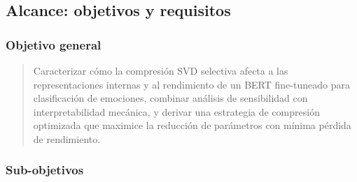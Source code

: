 \subsection{Alcance: objetivos y requisitos}
\label{sec:gep-alcance}

\subsubsection{Objetivo general}

\begin{quote}
    Caracterizar cómo la compresión SVD selectiva afecta a las
    representaciones internas y al rendimiento de un BERT fine-tuneado
    para clasificación de emociones, combinar análisis de sensibilidad
    con interpretabilidad mecánica, y derivar una estrategia de
    compresión optimizada que maximice la reducción de parámetros con
    mínima pérdida de rendimiento.
\end{quote}

\subsubsection{Sub-objetivos}

